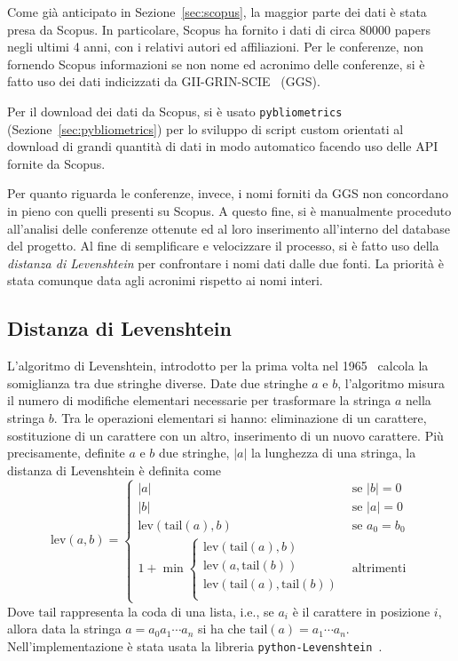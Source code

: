 Come già anticipato in Sezione~\ref{sec:scopus}, la maggior parte dei dati è
stata presa da Scopus. In particolare, Scopus ha fornito i dati di circa 80000
papers negli ultimi 4 anni, con i relativi autori ed affiliazioni.
Per le conferenze, non fornendo Scopus informazioni se non nome ed acronimo
delle conferenze, si è fatto uso dei dati indicizzati da GII-GRIN-SCIE~\cite{giigrinscie} (GGS).

Per il download dei dati da Scopus, si è usato \texttt{pybliometrics}
(Sezione~\ref{sec:pybliometrics}) per lo sviluppo di script custom orientati
al download di grandi quantità di dati in modo automatico facendo uso delle
API fornite da Scopus.

Per quanto riguarda le conferenze, invece, i nomi forniti da
GGS non concordano in pieno con quelli presenti su Scopus. A questo fine,
si è manualmente proceduto all'analisi delle conferenze ottenute ed al loro
inserimento all'interno del database del progetto.
Al fine di semplificare e velocizzare il processo, si è fatto uso della
\textit{distanza di Levenshtein} per confrontare i nomi dati dalle due fonti.
La priorità è stata comunque data agli acronimi rispetto ai nomi interi.

\subsection{Distanza di Levenshtein}

L'algoritmo di Levenshtein, introdotto per la prima volta nel
1965~\cite{levenshtein1966} calcola la somiglianza tra due stringhe diverse.
Date due stringhe $a$ e $b$, l'algoritmo misura il numero di modifiche
elementari necessarie per trasformare la stringa $a$ nella stringa $b$.
Tra le operazioni elementari si hanno: eliminazione di un carattere,
sostituzione di un carattere con un altro, inserimento di un nuovo carattere.
Più precisamente, definite $a$ e $b$ due stringhe, $|a|$ la lunghezza di una
stringa, la distanza di Levenshtein è definita come
\begin{equation*}
  \text{lev}(a, b) =
  \begin{cases}
    |a| & \text{se } |b| = 0 \\
    |b| & \text{se } |a| = 0 \\
    \text{lev}(\text{tail}(a), b) & \text{se } a_0 = b_0 \\
    1 + \min\begin{cases}
      \text{lev}(\text{tail}(a), b) \\
      \text{lev}(a, \text{tail}(b)) \\
      \text{lev}(\text{tail}(a), \text{tail}(b)) \\
    \end{cases}
    & \text{altrimenti}
  \end{cases}
\end{equation*}
%
Dove $\text{tail}$ rappresenta la coda di una lista, i.e., se $a_i$ è il
carattere in posizione $i$, allora data la stringa $a = a_0a_1\cdots a_n$ si ha
che $\text{tail}(a) = a_1\cdots a_n$.
Nell'implementazione è stata usata la libreria
\texttt{python-Levenshtein}~\cite{pythonLevenshtein}.

